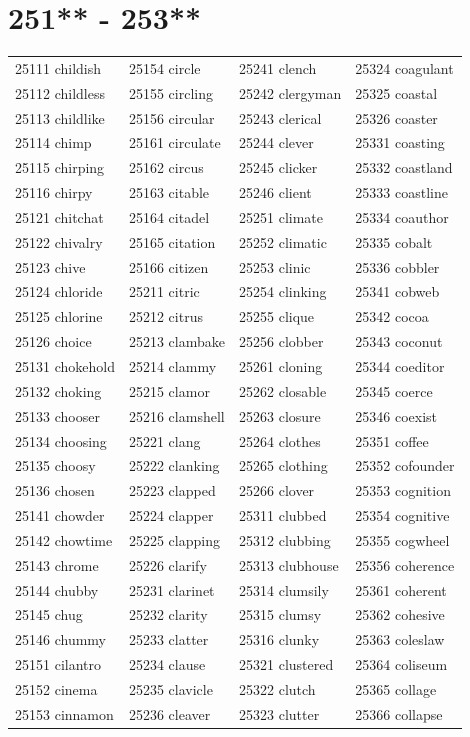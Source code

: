 \documentclass[10pt, oneside]{book}
\begin{document}
\begin{table}
	\centering
	\section*{251** - 253**}
	\begin{tabular}{l l l l}
25111 childish &25154 circle &25241 clench &25324 coagulant\\
25112 childless &25155 circling &25242 clergyman &25325 coastal\\
25113 childlike &25156 circular &25243 clerical &25326 coaster\\
25114 chimp &25161 circulate &25244 clever &25331 coasting\\
25115 chirping &25162 circus &25245 clicker &25332 coastland\\
25116 chirpy &25163 citable &25246 client &25333 coastline\\
25121 chitchat &25164 citadel &25251 climate &25334 coauthor\\
25122 chivalry &25165 citation &25252 climatic &25335 cobalt\\
25123 chive &25166 citizen &25253 clinic &25336 cobbler\\
25124 chloride &25211 citric &25254 clinking &25341 cobweb\\
25125 chlorine &25212 citrus &25255 clique &25342 cocoa\\
25126 choice &25213 clambake &25256 clobber &25343 coconut\\
25131 chokehold &25214 clammy &25261 cloning &25344 coeditor\\
25132 choking &25215 clamor &25262 closable &25345 coerce\\
25133 chooser &25216 clamshell &25263 closure &25346 coexist\\
25134 choosing &25221 clang &25264 clothes &25351 coffee\\
25135 choosy &25222 clanking &25265 clothing &25352 cofounder\\
25136 chosen &25223 clapped &25266 clover &25353 cognition\\
25141 chowder &25224 clapper &25311 clubbed &25354 cognitive\\
25142 chowtime &25225 clapping &25312 clubbing &25355 cogwheel\\
25143 chrome &25226 clarify &25313 clubhouse &25356 coherence\\
25144 chubby &25231 clarinet &25314 clumsily &25361 coherent\\
25145 chug &25232 clarity &25315 clumsy &25362 cohesive\\
25146 chummy &25233 clatter &25316 clunky &25363 coleslaw\\
25151 cilantro &25234 clause &25321 clustered &25364 coliseum\\
25152 cinema &25235 clavicle &25322 clutch &25365 collage\\
25153 cinnamon &25236 cleaver &25323 clutter &25366 collapse\\
	\end{tabular}
 \end{table}
\clearpage
\end{document}
